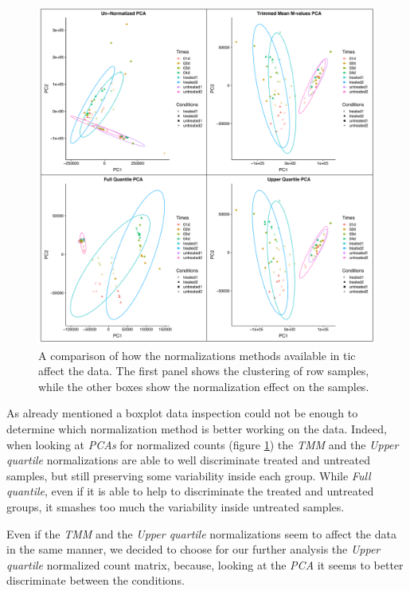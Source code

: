 \begin{figure}[H]
\includegraphics[width=12cm,keepaspectratio]{img/ticorser/normalizing/pca/all_pca.pdf}
\caption[ticorser normalizing \gls{pca}]{A comparison of how the normalizations methods available in \gls{tic} affect the data.
The first panel shows the clustering of row samples, while the other boxes show the normalization effect on the samples.}
\label{fig:ticorsernormalizingpca}
\centering
\end{figure}

As already mentioned a boxplot data inspection could not be enough to determine which normalization method is better working on the data. 
Indeed, when looking at \textit{PCAs} for normalized counts (figure \ref{fig:ticorsernormalizingpca}) the \textit{TMM} and the \textit{Upper quartile} normalizations are able to well discriminate treated and untreated samples, but still preserving some variability inside each group.
While \textit{Full quantile}, even if it is able to help to discriminate the treated and untreated groups, it smashes too much the variability inside untreated samples.

Even if the \textit{TMM} and the \textit{Upper quartile} normalizations seem to affect the data in the same manner, we decided to choose for our further analysis the \textit{Upper quartile} normalized count matrix, because, looking at the \textit{PCA} it seems to better discriminate between the conditions.


